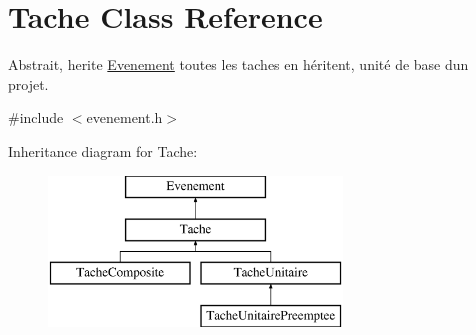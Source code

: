 \hypertarget{class_tache}{}\section{Tache Class Reference}
\label{class_tache}


Abstrait, herite \hyperlink{class_evenement}{Evenement} toutes les taches en héritent, unité de base d\textquotesingle{}un projet.  




{\ttfamily \#include $<$evenement.\+h$>$}

Inheritance diagram for Tache\+:\begin{figure}[H]
\begin{center}
\leavevmode
\includegraphics[height=4.000000cm]{class_tache}
\end{center}
\end{figure}
